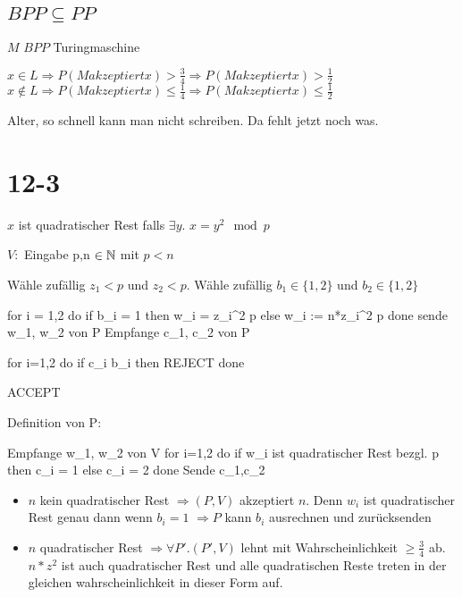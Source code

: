 \documentclass[12pt, oneside, a4paper, numbers=enddot, abstracton, parskip=full]{scrreprt}
\begin{document}
\subsection{$BPP \subseteq PP$}
$M$ $BPP$ Turingmaschine

$x \in L \Rightarrow P(M akzeptiert x) > \frac{3}{4} \Rightarrow P(M akzeptiert x) > \frac{1}{2}$
$x \notin L \Rightarrow P(M akzeptiert x) \leq \frac{1}{4} \Rightarrow P(M akzeptiert x) \leq \frac{1}{2}$

Alter, so schnell kann man nicht schreiben. Da fehlt jetzt noch was.

\section{12-3}
\label{sec:label}
$x$ ist quadratischer Rest falls $\exists y.$ $x=y^2 \mod p$

$V:$ Eingabe p,n $\in \mathbb{N}$ mit $p<n$

Wähle zufällig $z_1 < p$ und $z_2 <p$. Wähle zufällig $b_1 \in \{1,2\}$ und $b_2 \in \{1,2\}$

\begin{codebox}[javascript]
for  i = 1,2 do 
  if b_i = 1 then w_i = z_i^2 \mod p else w_i := n*z_i^2 \mod p
  done
sende w_1, w_2 von P
Empfange c_1, c_2 von P

for i=1,2 do
  if c_i \noteq b_i then REJECT
done

ACCEPT
\end{codebox}

Definition von P:
\begin{codebox}[javascript]
  Empfange w_1, w_2 von V
  for i=1,2 do
    if w_i ist quadratischer Rest bezgl. p then c_i = 1
    else c_i = 2
    done
    Sende c_1,c_2
\end{codebox}

\begin{itemize}
\item $n$ kein quadratischer Rest  $\Rightarrow (P,V)$ akzeptiert $n$.
Denn $w_i$ ist quadratischer Rest genau dann wenn $b_i = 1$
$\Rightarrow P$ kann $b_i$ ausrechnen und zurücksenden
\item $n$ quadratischer Rest $\Rightarrow \forall P'. (P', V)$ lehnt
  mit Wahrscheinlichkeit $\geq \frac{3}{4}$ ab. $n*z^2$ ist auch
  quadratischer Rest und alle quadratischen Reste treten in der
  gleichen wahrscheinlichkeit in dieser Form auf.
\end{itemize}
\end{document}
